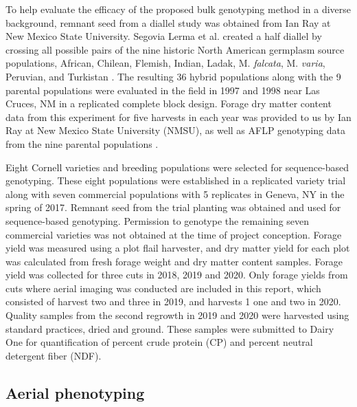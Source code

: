 \documentclass[12pt, letterpaper]{article}
\begin{document}
To help evaluate the efficacy of the proposed bulk genotyping method in a diverse background, remnant seed from a diallel study \parencite{segovia2004} was obtained from Ian Ray at New Mexico State University. Segovia Lerma et al. \parencite*{segovia2004} created a half diallel by crossing all possible pairs of the nine historic North American germplasm source populations, African, Chilean, Flemish, Indian, Ladak, M. \emph{falcata}, M. \emph{varia}, Peruvian, and Turkistan \parencite{barnes1977}. The resulting 36 hybrid populations along with the 9 parental populations were evaluated in the field in 1997 and 1998 near Las Cruces, NM in a replicated complete block design. Forage dry matter content data from this experiment for five harvests in each year was provided to us by Ian Ray at New Mexico State University (NMSU), as well as AFLP genotyping data from the nine parental populations \parencite[1544 AFLP markers;][]{segovia2004}.

Eight Cornell varieties and breeding populations were selected for sequence-based genotyping. These eight populations were established in a replicated variety trial along with seven commercial populations with 5 replicates in Geneva, NY in the spring of 2017. Remnant seed from the trial planting was obtained and used for sequence-based genotyping. Permission to genotype the remaining seven commercial varieties was not obtained at the time of project conception. Forage yield was measured using a plot flail harvester, and dry matter yield for each plot was calculated from fresh forage weight and dry matter content samples. Forage yield was collected for three cuts in 2018, 2019 and 2020. Only forage yields from cuts where aerial imaging was conducted are included in this report, which consisted of harvest two and three in 2019, and harvests 1 one and two in 2020. Quality samples from the second regrowth in 2019 and 2020 were harvested using standard practices, dried and ground. These samples were submitted to Dairy One for quantification of percent crude protein (CP) and percent neutral detergent fiber (NDF).


\subsection{Aerial phenotyping}
\end{document}
